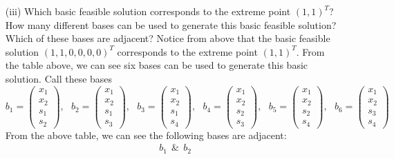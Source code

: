 \documentclass{article}
\begin{document}
\begin{itemize}
    \item[(iii)] Which basic feasible solution corresponds to the extreme point $(1,1)^T$? How many different bases can be used to generate this basic feasible solution? Which of these bases are adjacent?
    \newline\newline
    Notice from above that the basic feasible solution $(1,1,0,0,0,0)^T$ corresponds to the extreme point $(1,1)^T$. From the table above, we can see six bases can be used to generate this basic solution. Call these bases
    \[b_1 = \begin{pmatrix}
        x_1\\
        x_2\\
        s_1\\
        s_2
    \end{pmatrix}
    ,\:\:\:
    b_2 = \begin{pmatrix}
        x_1\\
        x_2\\
        s_1\\
        s_3
    \end{pmatrix}
    ,\:\:\:
    b_3 = \begin{pmatrix}
        x_1\\
        x_2\\
        s_1\\
        s_4
    \end{pmatrix}
    ,\:\:\:
    b_4 = \begin{pmatrix}
        x_1\\
        x_2\\
        s_2\\
        s_3
    \end{pmatrix}
    ,\:\:\:
    b_5 = \begin{pmatrix}
        x_1\\
        x_2\\
        s_2\\
        s_4
    \end{pmatrix}
    ,\:\:\:
    b_6 = \begin{pmatrix}
        x_1\\
        x_2\\
        s_3\\
        s_4
    \end{pmatrix}
    \]
    From the above table, we can see the following bases are adjacent:
    \begin{align*}
        &b_1 \:\: \& \:\: b_2 \\

\end{align*}
\end{itemize}
\end{document}
